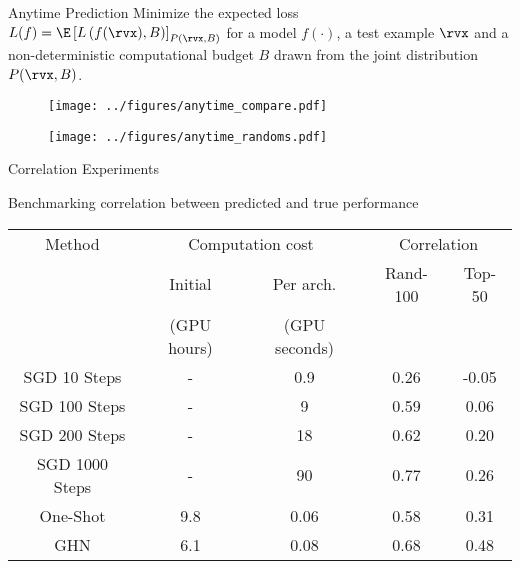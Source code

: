\documentclass[final,t]{beamer}
\begin{document}
\begin{frame}{}
\begin{columns}[t]
\begin{column}{.32\linewidth}
	  
	  \begin{exampleblock}{Anytime Prediction}
	  Minimize the expected loss 
$L(f) = \E\left[ L\left( f(\rvx), B \right)\right]_{P(\rvx, B)}$
for a model $f(\cdot)$, a test example $\rvx$ and a non-deterministic computational budget $B$
drawn from the joint distribution $P(\rvx, B)$. 
	\begin{figure}[t]
	\centering
	\begin{minipage}{.48\textwidth}
	  \centering
	  \texttt{[image: ../figures/anytime\_compare.pdf]}
	\label{table:Results4}
	  \label{fig:test1}
	\end{minipage}%
	\begin{minipage}{.48\textwidth}
	  \centering
	  \texttt{[image: ../figures/anytime\_randoms.pdf]}
	  \label{fig:test2}
	\end{minipage}
	\end{figure}
    \end{exampleblock}
    
    
    
	\begin{exampleblock}{Correlation Experiments}


	Benchmarking correlation between predicted and true performance
			\begin{table}[t]
					\small
					\begin{center}
					\begin{tabular}{ c c c c c} 
					Method & \multicolumn{2}{c}{Computation cost}   & \multicolumn{2}{c}{Correlation}    \\ 
					 & Initial  & Per arch.   & Rand-100 & Top-50   \\ 
					 & (GPU hours) & (GPU seconds) &&\\
					\hline
					SGD 10 Steps & - & 0.9 & 0.26 & -0.05\\
					SGD 100 Steps & - & 9 & 0.59 & 0.06\\
					SGD 200 Steps & - & 18 & 0.62 & 0.20 \\
					SGD 1000 Steps & - & 90 & 0.77 & 0.26 \\
					One-Shot & 9.8 & 0.06 & 0.58 & 0.31\\
					\hline
					\hline
					GHN & 6.1 & 0.08 & 0.68 & 0.48
				\end{tabular}
				\end{center}
			\end{table}	
			

\end{exampleblock}
\end{column}
\end{columns}
\end{frame}
\end{document}
